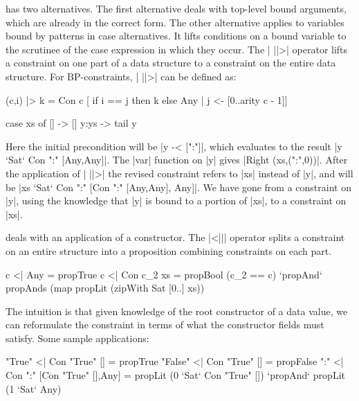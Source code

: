 has two alternatives. The first alternative deals with top-level bound arguments, which are already in the correct form. The other alternative applies to variables bound by patterns in case alternatives. It lifts conditions on a bound variable to the scrutinee of the case expression in which they occur. The | ||>| operator lifts a constraint on one part of a data structure to a constraint on the entire data structure. For BP-constraints, | ||>| can be defined as:

\begin{code}
(c,i) |> k = Con c  [  if i == j then k else Any
                    |  j <- [0..arity c - 1]]
\end{code}

\begin{example}
\ignore\begin{code}
case  xs of
      []    -> []
      y:ys  -> tail y
\end{code}

Here the initial precondition will be |y -< [":"]|, which evaluates to the result |y `Sat` Con ":" [Any,Any]|. The |var| function on |y| gives |Right (xs,(":",0))|. After the application of | ||>| the revised constraint refers to |xs| instead of |y|, and will be |xs `Sat` Con ":" [Con ":" [Any,Any], Any]|. We have gone from a constraint on |y|, using the knowledge that |y| is bound to a portion of |xs|, to a constraint on |xs|.
\end{example}

 deals with an application of a constructor. The |<||| operator splits a constraint on an entire structure into a proposition combining constraints on each part.

\begin{code}
c <| Any         =  propTrue
c <| Con c_2 xs  =  propBool (c_2 == c) `propAnd` propAnds (map propLit (zipWith Sat [0..] xs))
\end{code}

The intuition is that given knowledge of the root constructor of a data value, we can reformulate the constraint in terms of what the constructor fields must satisfy. Some sample applications:

\begin{code}
"True"   <| Con "True" [] = propTrue
"False"  <| Con "True" [] = propFalse
":" <| Con ":" [Con "True" [],Any]  =
    propLit (0 `Sat` Con "True" []) `propAnd` propLit (1 `Sat` Any)
\end{code}

